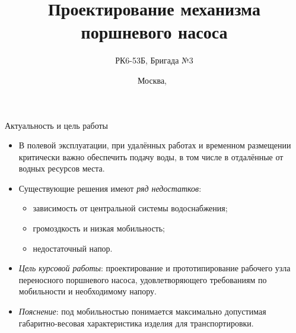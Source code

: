 \documentclass{beamer}
\begin{document}
\title{Проектирование механизма поршневого насоса}  
\author{РК6-53Б, Бригада №3}
\date{Москва,~\the\year} 
\frame{\titlepage} 

\begin{frame}{Актуальность и цель работы}
    \begin{itemize}
        \item В полевой эксплуатации, при удалённых работах и временном размещении критически важно обеспечить подачу воды,
            в том числе в отдалённые от водных ресурсов места.
        \item Существующие решения имеют \textit{ряд недостатков}:
            \begin{itemize}
                \item зависимость от центральной системы водоснабжения;
                \item громоздкость и низкая мобильность;
                \item недостаточный напор.
            \end{itemize}
        \item \textit{Цель курсовой работы}: проектирование и прототипирование рабочего узла переносного поршневого насоса,
            удовлетворяющего требованиям по мобильности и необходимому напору.
        \item \textit{Пояснение}: под мобильностью понимается максимально допустимая габаритно-весовая характеристика изделия для транспортировки.
    \end{itemize}
\end{frame}
\end{document}
